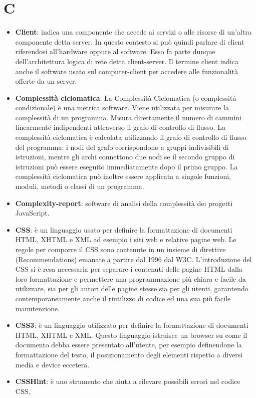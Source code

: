 \section{C}
\begin{itemize}
	\item
	\textbf{Client}: indica una componente che accede ai servizi o alle risorse di un'altra componente detta server. In questo contesto si può quindi parlare di client riferendosi all'hardware oppure al software. Esso fa parte dunque dell'architettura logica di rete detta client-server.
Il termine client indica anche il software usato sul computer-client per accedere alle funzionalità offerte da un server.
	\item
	\textbf{Complessità ciclomatica}: La Complessità Ciclomatica (o complessità condizionale) è una metrica software. Viene utilizzata per misurare la complessità di un programma. Misura direttamente il numero di cammini linearmente indipendenti attraverso il grafo di controllo di flusso. La complessità ciclomatica è calcolata utilizzando il grafo di controllo di flusso del programma: i nodi del grafo corrispondono a gruppi indivisibili di istruzioni, mentre gli archi connettono due nodi se il secondo gruppo di istruzioni può essere eseguito immediatamente dopo il primo gruppo. La complessità ciclomatica può inoltre essere applicata a singole funzioni, moduli, metodi o classi di un programma.
	\item
	\textbf{Complexity-report}: software di analisi della complessità dei progetti JavaScript. 
	\item
	\textbf{CSS}: è un linguaggio usato per definire la formattazione di documenti HTML, XHTML e XML ad esempio i siti web e relative pagine web. Le regole per comporre il CSS sono contenute in un insieme di direttive (Recommendations) emanate a partire dal 1996 dal W3C.
	L'introduzione del CSS si è resa necessaria per separare i contenuti delle pagine HTML dalla loro formattazione e permettere una programmazione più chiara e facile da utilizzare, sia per gli autori delle pagine stesse sia per gli utenti, garantendo contemporaneamente anche il riutilizzo di codice ed una sua più facile manutenzione. 
	\item
	\textbf{CSS3}: è un linguaggio utilizzato per definire la formattazione di documenti HTML, XHTML e XML.
	Questo linguaggio istruisce un browser su come il documento debba essere presentato all'utente, per esempio definendone la formattazione del testo, il posizionamento degli elementi rispetto a diversi media e device eccetera.
	\item
	\textbf{CSSHint}: è uno strumento che aiuta a rilevare possibili errori nel codice CSS.
\end{itemize}